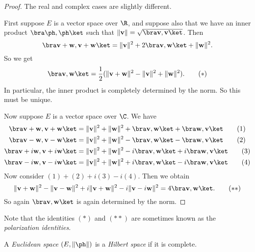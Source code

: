 \documentclass[a4paper]{article}
\begin{document}
\begin{proof}
  The real and complex cases are slightly different.

  First suppose $E$ is a vector space over $\R$, and suppose also that we have an inner product $\bra \ph,\ph\ket$ such that $\|\mathbf{v}\| = \sqrt{\bra \mathbf{v}, \mathbf{v}\ket }$. Then
  \[
    \bra \mathbf{v} + \mathbf{w}, \mathbf{v} + \mathbf{w}\ket = \|\mathbf{v}\|^2 + 2\bra \mathbf{v}, \mathbf{w}\ket  + \|\mathbf{w}\|^2.
  \]
  So we get
  \[
    \bra \mathbf{v}, \mathbf{w}\ket = \frac{1}{2} (\|\mathbf{v} + \mathbf{w}\|^2 - \|\mathbf{v}\|^2 + \|\mathbf{w}\|^2).\tag{$*$}
  \]
  In particular, the inner product is completely determined by the norm. So this must be unique.

  Now suppose $E$ is a vector space over $\C$. We have
  \begin{align*}
    \bra \mathbf{v} + \mathbf{w}, \mathbf{v} + \mathbf{w}\ket &= \|\mathbf{v}\|^2 + \|\mathbf{w}\|^2 + \bra \mathbf{v}, \mathbf{w}\ket + \bra \mathbf{w}, \mathbf{v}\ket\tag{1}\\
    \bra \mathbf{v} - \mathbf{w}, \mathbf{v} - \mathbf{w}\ket &= \|\mathbf{v}\|^2 + \|\mathbf{w}\|^2 - \bra \mathbf{v}, \mathbf{w}\ket - \bra \mathbf{w}, \mathbf{v}\ket\tag{2}\\
    \bra \mathbf{v} +i\mathbf{w}, \mathbf{v} +i\mathbf{w}\ket &= \|\mathbf{v}\|^2 + \|\mathbf{w}\|^2 -i\bra \mathbf{v}, \mathbf{w}\ket +i\bra \mathbf{w}, \mathbf{v}\ket\tag{3}\\
    \bra \mathbf{v} -i\mathbf{w}, \mathbf{v} -i\mathbf{w}\ket &= \|\mathbf{v}\|^2 + \|\mathbf{w}\|^2 +i\bra \mathbf{v}, \mathbf{w}\ket -i\bra \mathbf{w}, \mathbf{v}\ket\tag{4}
  \end{align*}
  Now consider $(1) + (2) + i(3) - i(4)$. Then we obtain
  \[
    \|\mathbf{v} + \mathbf{w}\|^2 - \|\mathbf{v} - \mathbf{w}\|^2 + i\|\mathbf{v} + \mathbf{w}\|^2 - i\|\mathbf{v} - i\mathbf{w}\|^2 = 4\bra \mathbf{v}, \mathbf{w}\ket.\tag{$**$}
  \]
  So again $\bra \mathbf{v}, \mathbf{w}\ket$ is again determined by the norm.
\end{proof}
Note that the identities $(*)$ and $(**)$ are sometimes known as the \emph{polarization identities}.

\begin{defi}
  A \emph{Euclidean space} $(E, \|\ph\|)$ is a \emph{Hilbert space} if it is complete.
\end{defi}
\end{document}
